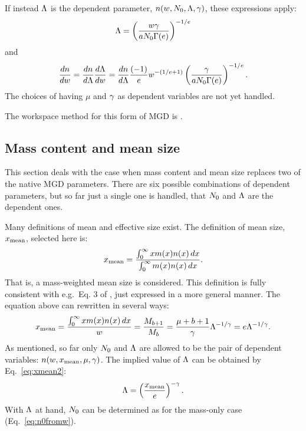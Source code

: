 If instead $\Lambda$ is the dependent parameter, $n(w,N_0,\Lambda,\gamma)$, these expressions apply:
\begin{equation}
  \Lambda = \left( \frac{w\gamma}{aN_0\Gamma(e)} \right)^{-1/e}
  \label{eq:mass:la}
\end{equation}
and
\begin{equation}
  \frac{dn}{dw} = \frac{dn}{d\Lambda}\frac{d\Lambda}{dw} = \frac{dn}{d\Lambda} 
  \frac{(-1)}{e}w^{-(1/e+1)}\left( \frac{\gamma}{aN_0\Gamma(e)} \right)^{-1/e}.
\end{equation}
The choices of having $\mu$ and $\gamma$ as dependent variables are not yet
handled. 

The workspace method for this form of MGD is .



\subsection{Mass content and mean size}
%
This section deals with the case when mass content and mean size replaces two
of the native MGD parameters. There are six possible combinations of 
dependent parameters, but so far just a single one is handled, that $N_0$ and
$\Lambda$ are the dependent ones. 

Many definitions of mean and effective size exist. The definition of mean size,
$x_\mathrm{mean}$, selected here is:
\begin{equation}
  x_\mathrm{mean} =\frac{\int_0^\infty x m(x) n(x)\,dx}{\int_0^\infty m(x) n(x)\,dx}.
\end{equation}
That is, a mass-weighted mean size is considered. This definition is fully
consistent with e.g.\ Eq. 3 of \citet{delanoe2014normalized}, just expressed
in a more general manner. The equation above can rewritten in several ways:
\begin{equation}
  x_\mathrm{mean} =\frac{\int_0^\infty x m(x) n(x)\,dx}{w}=\frac{M_{b+1}}{M_b}=
  \frac{\mu+b+1}{\gamma}\Lambda^{-1/\gamma}=e\Lambda^{-1/\gamma}.
  \label{eq:xmean2}
\end{equation}
As mentioned, so far only $N_0$ and $\Lambda$ are allowed to be the pair of
dependent variables: $n(w,x_\mathrm{mean},\mu,\gamma)$. The implied value of $\Lambda$ can be
obtained by Eq.~\ref{eq:xmean2}:
\begin{equation}
  \Lambda = \left( \frac{x_\mathrm{mean}}{e}\right)^{-\gamma}.
\end{equation}
With $\Lambda$ at hand, $N_0$ can be determined as for the mass-only case
(Eq.~\ref{eq:n0fromw}).

